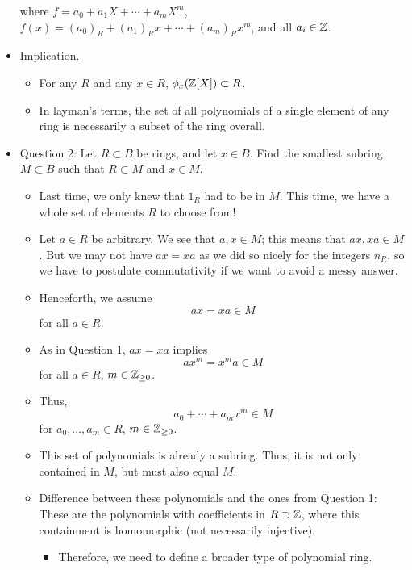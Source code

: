 \documentclass[../notes.tex]{subfiles}
\begin{document}
\begin{itemize}
    where $f=a_0+a_1X+\cdots+a_mX^m$, $f(x)=(a_0)_R+(a_1)_Rx+\cdots+(a_m)_Rx^m$, and all $a_i\in\mathbb{Z}$.
    \item Implication.
    \begin{itemize}
        \item For any $R$ and any $x\in R$, $\phi_x(\mathbb{Z}[X])\subset R$.
        \item In layman's terms, the set of all polynomials of a single element of any ring is necessarily a subset of the ring overall.
    \end{itemize}
    \item Question 2: Let $R\subset B$ be rings, and let $x\in B$. Find the smallest subring $M\subset B$ such that $R\subset M$ and $x\in M$.
    \begin{itemize}
        \item Last time, we only knew that $1_R$ had to be in $M$. This time, we have a whole set of elements $R$ to choose from!
        \item Let $a\in R$ be arbitrary. We see that $a,x\in M$; this means that $ax,xa\in M$. But we may not have $ax=xa$ as we did so nicely for the integers $n_R$, so we have to postulate commutativity if we want to avoid a messy answer.
        \item Henceforth, we assume
        \begin{equation*}
            ax=xa \in M
        \end{equation*}
        for all $a\in R$.
        \item As in Question 1, $ax=xa$ implies
        \begin{equation*}
            ax^m=x^ma \in M
        \end{equation*}
        for all $a\in R$, $m\in{\mathbb{Z}_{\geq 0}}$.
        \item Thus,
        \begin{equation*}
            a_0+\cdots+a_mx^m \in M
        \end{equation*}
        for $a_0,\dots,a_m\in R$, $m\in{\mathbb{Z}_{\geq 0}}$.
        \item This set of polynomials is already a subring. Thus, it is not only contained in $M$, but must also equal $M$.
        \item Difference between these polynomials and the ones from Question 1: These are the polynomials with coefficients in $R\supset\mathbb{Z}$, where this containment is homomorphic (not necessarily injective).
        \begin{itemize}
            \item Therefore, we need to define a broader type of polynomial ring.

\end{itemize}
\end{itemize}
\end{itemize}
\end{document}
